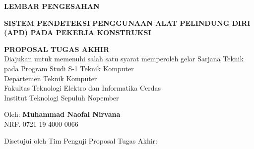 \begin{center}
  \large
  \textbf{LEMBAR PENGESAHAN}
\end{center}

\thispagestyle{empty}

\begin{center}
  \textbf{SISTEM PENDETEKSI PENGGUNAAN ALAT PELINDUNG DIRI (APD) PADA PEKERJA KONSTRUKSI}
\end{center}

\begingroup
\small

\begin{center}
  \textbf{PROPOSAL TUGAS AKHIR} \\
  Diajukan untuk memenuhi salah satu syarat memperoleh gelar
  Sarjana Teknik pada
  Program Studi S-1 Teknik Komputer \\
  Departemen Teknik Komputer \\
  Fakultas Teknologi Elektro dan Informatika Cerdas \\
  Institut Teknologi Sepuluh Nopember
\end{center}

\begin{center}
  Oleh: \textbf{Muhammad Naofal Nirvana} \\
  NRP. 0721 19 4000 0066
\end{center}

\begin{center}
  Disetujui oleh Tim Penguji Proposal Tugas Akhir:
\end{center}

\begingroup
\setlength{\tabcolsep}{0pt}

